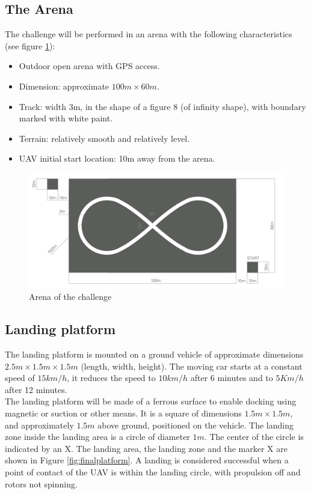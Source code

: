\subsection{The Arena}
The challenge will be performed in an arena with the following characteristics (see figure \ref{fig:arenachallenge}):
\begin{itemize}
\item Outdoor open arena with GPS access.
\item Dimension: approximate  $100m \times 60m$.
\item Track: width 3m, in the shape of a figure 8 (of infinity shape), with boundary marked with white paint.
\item Terrain: relatively smooth and relatively level. 
\item UAV initial start location: 10m away from the arena.
\end{itemize}

\begin{figure}[!htbp]
    \centering
    \includegraphics[width=1\textwidth]{img/arena.png}
    \caption{Arena of the challenge}
    \label{fig:arenachallenge}
\end{figure}

\subsection{Landing platform}
The landing platform is mounted on a ground vehicle of approximate dimensions $2.5m \times 1.5m \times 1.5m$ (length, width, height). The moving car starts at a constant speed of $15km/h$, it reduces the speed to $10km/h$ after 6 minutes and to $5 Km/h$ after 12 minutes.\\
The landing platform will be made of a ferrous surface to enable docking using magnetic or suction or other means.
It is a square of dimensions $1.5m \times 1.5m$, and approximately $1.5m$ above ground, positioned on the vehicle. 
The landing zone inside the landing area is a circle of diameter $1m$. The center of the circle is indicated by an X. The landing area, the landing zone and the marker X are shown in Figure \ref{fig:finalplatform}.
A landing is considered successful when a point of contact of the UAV is within the landing circle, with propulsion off and rotors not spinning.\\

